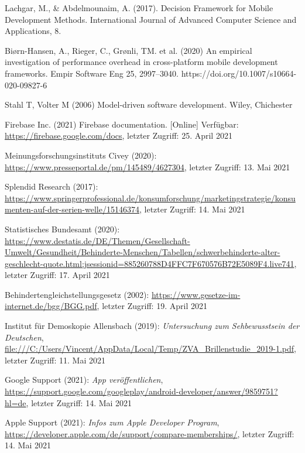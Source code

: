 \documentclass[11pt,a4paper]{article}
\begin{document}
\begin{itemize}
	 Lachgar, M., \& Abdelmounaim, A. (2017). Decision Framework for Mobile Development Methods. International Journal of Advanced Computer Science and Applications, 8.

	 Biørn-Hansen, A., Rieger, C., Grønli, TM. et al. (2020) An empirical investigation of performance overhead in cross-platform mobile development frameworks. Empir Software Eng 25, 2997–3040. https://doi.org/10.1007/s10664-020-09827-6

	 Stahl T, Volter M (2006) Model-driven software development. Wiley, Chichester

	 Firebase Inc. (2021) Firebase documentation. [Online] Verfügbar: \url{https://firebase.google.com/docs}, letzter Zugriff: 25. April 2021

     Meinungsforschungsinstituts Civey (2020):  \url{https://www.presseportal.de/pm/145489/4627304}, letzter Zugriff: 13. Mai 2021

     Splendid Research (2017): \url{https://www.springerprofessional.de/konsumforschung/marketingstrategie/konsumenten-auf-der-serien-welle/15146374}, letzter Zugriff: 14. Mai 2021

     Statistisches Bundesamt (2020): \url{https://www.destatis.de/DE/Themen/Gesellschaft-Umwelt/Gesundheit/Behinderte-Menschen/Tabellen/schwerbehinderte-alter-geschlecht-quote.html;jsessionid=885260788D4FFC7F670576B72E5089F4.live741}, letzter Zugriff: 17. April 2021

     Behindertengleichstellungsgesetz (2002): \url{https://www.gesetze-im-internet.de/bgg/BGG.pdf}, letzter Zugriff: 19. April 2021

     Institut für Demoskopie Allensbach (2019): \textit{Untersuchung zum Sehbewusstsein der Deutschen},  \url{file:///C:/Users/Vincent/AppData/Local/Temp/ZVA_Brillenstudie_2019-1.pdf}, letzter Zugriff: 11. Mai 2021
    
     Google Support (2021): \textit{App veröffentlichen}, \url{https://support.google.com/googleplay/android-developer/answer/9859751?hl=de}, letzter Zugriff: 14. Mai 2021
    
     Apple Support (2021): \textit{Infos zum Apple Developer Program}, \url{https://developer.apple.com/de/support/compare-memberships/}, letzter Zugriff: 14. Mai 2021
\end{itemize}

\end{document}
